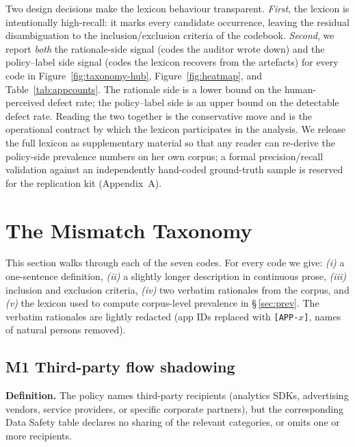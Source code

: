 \documentclass[11pt,a4paper]{article}
\newcommand{\code}[1]{\textsf{\textbf{#1}}}
\begin{document}
Two design decisions make the lexicon behaviour transparent.
\emph{First}, the lexicon is intentionally high-recall: it marks every
candidate occurrence, leaving the residual disambiguation to the
inclusion/exclusion criteria of the codebook. \emph{Second}, we
report \emph{both} the rationale-side signal (codes the auditor wrote
down) and the policy--label side signal (codes the lexicon recovers
from the artefacts) for every code in
Figure~\ref{fig:taxonomy-hub}, Figure~\ref{fig:heatmap}, and
Table~\ref{tab:appcounts}. The rationale side is a lower bound on
the human-perceived defect rate; the policy--label side is an upper
bound on the detectable defect rate. Reading the two together is
the conservative move and is the operational contract by which the
lexicon participates in the analysis. We release the full lexicon as
supplementary material so that any reader can re-derive the
policy-side prevalence numbers on her own corpus; a formal
precision/recall validation against an independently hand-coded
ground-truth sample is reserved for the replication kit
(Appendix~A).

\section{The Mismatch Taxonomy}\label{sec:taxonomy}

This section walks through each of the seven codes. For every code we
give: \emph{(i)} a one-sentence definition, \emph{(ii)} a slightly
longer description in continuous prose, \emph{(iii)} inclusion and
exclusion criteria, \emph{(iv)} two verbatim rationales from the
corpus, and \emph{(v)} the lexicon used to compute corpus-level
prevalence in \S\,\ref{sec:prev}. The verbatim rationales are
lightly redacted (app IDs replaced with \texttt{[APP-$x$]}, names
of natural persons removed).

\subsection{\code{M1} Third-party flow shadowing}
\label{sec:M1}
\textbf{Definition.} The policy names third-party recipients
(analytics SDKs, advertising vendors, service providers, or specific
corporate partners), but the corresponding Data Safety table declares
no sharing of the relevant categories, or omits one or more recipients.
\end{document}
